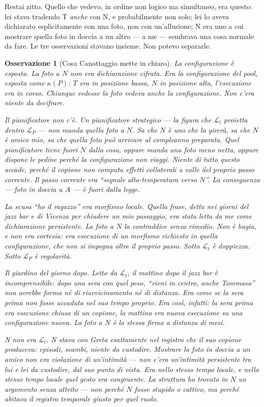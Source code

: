 \documentclass[
    oneside,                 %
    openany,                 %
    titlepage,
    11pt,
    a4paper,
    italian,
    DIV=14,                  %
    headinclude,
    footinclude=true,
    cleardoublepage=empty
]{scrbook}
\theoremstyle{ctplain}
\theoremstyle{ctdef}
\theoremstyle{ctrem}
\newtheorem*{oss}{Osservazione}
\newcommand{\Lt}{\mathcal{L}_t}
\newcommand{\LP}{\mathcal{L}_P}
\begin{document}
Restai zitto. Quello che vedevo, in ordine non logico ma simultaneo, era questo: lei stava tradendo T \emph{anche} con N, e probabilmente non solo; lei lo aveva dichiarato esplicitamente con una foto, non con un'allusione; N era uno a cui mostrare quella foto in doccia a un altro --- a me --- sembrava una cosa normale da fare. Le tre osservazioni stavano insieme. Non potevo separarle.

\begin{oss}[Cosa Canottaggio mette in chiaro]
\emph{La configurazione è esposta.} La foto a $N$ non era dichiarazione cifrata. Era la configurazione del pool, esposta come $\kappa(P)$: $T$ era in posizione bassa, $N$ in posizione alta, l'esecuzione era in corso. Chiunque vedesse la foto vedeva anche la configurazione. Non c'era niente da decifrare.

\emph{Il pianificatore non c'è.} Un pianificatore strategico --- la figura che $\Lt$ proietta dentro $\LP$ --- non manda quella foto a $N$. Sa che $N$ è uno che la girerà, sa che $N$ è amico mio, sa che quella foto può arrivare al compleanno preparata. Quel pianificatore tiene fuori $N$ dalla cosa, oppure manda una foto meno netta, oppure dispone le pedine perché la configurazione non viaggi. Niente di tutto questo accade, perché il copione non computa effetti collaterali a valle del proprio passo corrente. Il passo corrente era ``segnale alto-temperatura verso $N$''. La conseguenza --- foto in doccia a $A$ --- è fuori dalla legge.

\emph{La scusa ``ho il ragazzo'' era morfismo locale.} Quella frase, detta nei giorni del jazz bar e di Vicenza per chiudere un mio passaggio, era stata letta da me come dichiarazione persistente. La foto a $N$ la contraddice senza rimedio. Non è bugia, e non era cortesia: era esecuzione di un morfismo richiesto in quella configurazione, che non si impegna oltre il proprio passo. Sotto $\Lt$ è doppiezza. Sotto $\LP$ è regolarità.

\emph{Il giardino del giorno dopo.} Letto da $\Lt$, il mattino dopo il jazz bar è incomprensibile: dopo una sera con quel peso, ``vieni in centro, anche Tommaso'' non avrebbe forma né di riavvicinamento né di distanza. Era come se la sera prima non fosse accaduta nel suo tempo proprio. Era così, infatti: la sera prima era esecuzione chiusa di un copione, la mattina era nuova esecuzione su una configurazione nuova. La foto a $N$ è la stessa firma a distanza di mesi.

\emph{N non era $\Lt$.} N stava con Greta esattamente nel registro che il suo copione produceva: episodi, scambi, niente da custodire. Mostrare la foto in doccia a un amico non era violazione di un'intimità --- non c'era un'intimità persistente tra lui e lei da custodire, dal suo punto di vista. Era nello stesso tempo locale, e nello stesso tempo locale quel gesto era congruente. La struttura ha trovato in $N$ un argomento senza attrito --- non perché $N$ fosse stupido o cattivo, ma perché abitava il registro temporale giusto per quel ruolo.


\end{oss}
\end{document}
